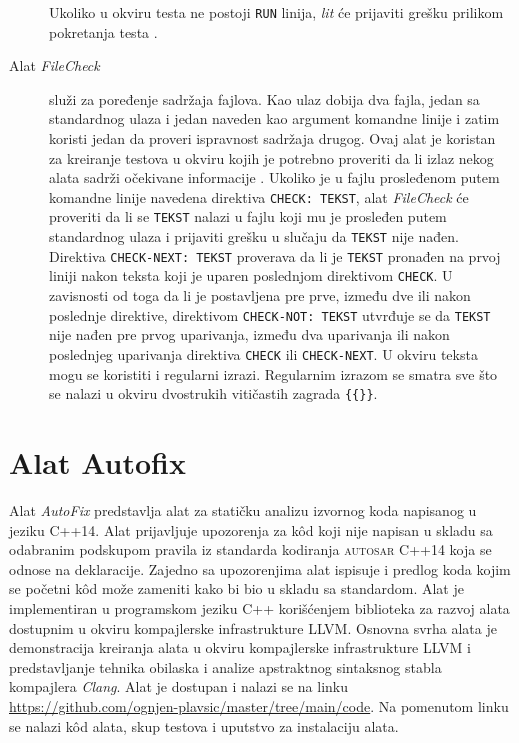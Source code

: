 \documentclass[12pt,oneside]{memoir}
\begin{document}
\begin{description}
Ukoliko u okviru testa ne postoji \texttt{RUN} linija, \textit{lit} \'{c}e prijaviti gre\v{s}ku prilikom pokretanja testa \cite{LIT}. \par
  \item[Alat \textit{FileCheck}] slu\v{z}i za poređenje sadr\v{z}aja fajlova. Kao ulaz dobija dva fajla, jedan sa standardnog ulaza i jedan naveden kao argument komandne linije i zatim koristi jedan da proveri ispravnost sadr\v{z}aja drugog. Ovaj alat je koristan za kreiranje testova u okviru kojih je potrebno proveriti da li izlaz nekog alata sadr\v{z}i o\v{c}ekivane informacije \cite{FileCheck}. 
Ukoliko je u fajlu prosleđenom putem komandne linije navedena direktiva \texttt{CHECK: TEKST}, alat \textit{FileCheck} \'{c}e proveriti da li se \texttt{TEKST} nalazi u fajlu koji mu je prosleđen putem standardnog ulaza i prijaviti gre\v{s}ku u slu\v{c}aju da \texttt{TEKST} nije nađen.
Direktiva \texttt{CHECK-NEXT: TEKST} proverava da li je \texttt{TEKST} pronađen na prvoj liniji nakon teksta koji je uparen poslednjom direktivom \texttt{CHECK}. U zavisnosti od toga da li je postavljena pre prve, između dve ili nakon poslednje direktive, direktivom \texttt{CHECK-NOT: TEKST} utvrđuje se da  \texttt{TEKST} nije nađen pre prvog uparivanja, između dva uparivanja ili nakon poslednjeg uparivanja direktiva \texttt{CHECK} ili \texttt{CHECK-NEXT}. U okviru teksta mogu se koristiti i regularni izrazi. Regularnim izrazom se smatra sve \v{s}to se nalazi u okviru dvostrukih viti\v{c}astih zagrada \texttt{\{\{\}\}}.
\end{description}


\chapter{Alat Autofix}
\label{chp:autofix}

Alat \textit{AutoFix} predstavlja alat za stati\v{c}ku analizu izvornog koda napisanog u jeziku C++14. Alat prijavljuje upozorenja
za k\^{o}d koji nije napisan u skladu sa odabranim podskupom pravila iz standarda kodiranja \textsc{autosar} C++14 koja se odnose na deklaracije. Zajedno sa upozorenjima alat 
ispisuje i predlog koda kojim se po\v{c}etni k\^{o}d mo\v{z}e zameniti kako bi bio u skladu sa standardom.
Alat je implementiran u programskom jeziku C++ kori\v{s}\'{c}enjem biblioteka za razvoj alata dostupnim u okviru kompajlerske infrastrukture LLVM.
Osnovna svrha alata je demonstracija kreiranja alata u okviru kompajlerske infrastrukture LLVM i predstavljanje tehnika obilaska i analize apstraktnog sintaksnog stabla kompajlera \textit{Clang}. 
Alat je dostupan i nalazi se na linku \url{https://github.com/ognjen-plavsic/master/tree/main/code}. Na pomenutom linku se nalazi k\^{o}d alata, skup testova i uputstvo za instalaciju alata.
\end{document}
